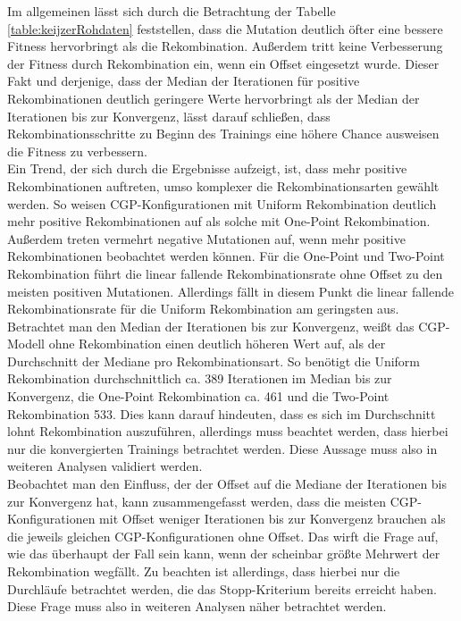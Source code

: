 Im allgemeinen lässt sich durch die Betrachtung der Tabelle \ref{table:keijzerRohdaten} feststellen, dass die Mutation deutlich öfter eine bessere Fitness hervorbringt als die Rekombination.
Außerdem tritt keine Verbesserung der Fitness durch Rekombination ein, wenn ein Offset eingesetzt wurde.
Dieser Fakt und derjenige, dass der Median der Iterationen für positive Rekombinationen deutlich geringere Werte hervorbringt als der Median der Iterationen bis zur Konvergenz, lässt darauf schließen, dass Rekombinationsschritte zu Beginn des Trainings eine höhere Chance ausweisen die Fitness zu verbessern.\\
Ein Trend, der sich durch die Ergebnisse aufzeigt, ist, dass mehr positive Rekombinationen auftreten, umso komplexer die Rekombinationsarten gewählt werden.
So weisen CGP-Konfigurationen mit Uniform Rekombination deutlich mehr positive Rekombinationen auf als solche mit One-Point Rekombination.
Außerdem treten vermehrt negative Mutationen auf, wenn mehr positive Rekombinationen beobachtet werden können.
Für die One-Point und Two-Point Rekombination führt die linear fallende Rekombinationsrate ohne Offset zu den meisten positiven Mutationen.
Allerdings fällt in diesem Punkt die linear fallende Rekombinationsrate für die Uniform Rekombination am geringsten aus.\\
Betrachtet man den Median der Iterationen bis zur Konvergenz, weißt das CGP-Modell ohne Rekombination einen deutlich höheren Wert auf, als der Durchschnitt der Mediane pro Rekombinationsart. 
So benötigt die Uniform Rekombination durchschnittlich ca. 389 Iterationen im Median bis zur Konvergenz, die One-Point Rekombination ca. 461 und die Two-Point Rekombination 533.
Dies kann darauf hindeuten, dass es sich im Durchschnitt lohnt Rekombination auszuführen, allerdings muss beachtet werden, dass hierbei nur die konvergierten Trainings betrachtet werden.
Diese Aussage muss also in weiteren Analysen validiert werden.\\
Beobachtet man den Einfluss, der der Offset auf die Mediane der Iterationen bis zur Konvergenz hat, kann zusammengefasst werden, dass die meisten CGP-Konfigurationen mit Offset weniger Iterationen bis zur Konvergenz brauchen als die jeweils gleichen CGP-Konfigurationen ohne Offset.
Das wirft die Frage auf, wie das überhaupt der Fall sein kann, wenn der scheinbar größte Mehrwert der Rekombination wegfällt.
Zu beachten ist allerdings, dass hierbei nur die Durchläufe betrachtet werden, die das Stopp-Kriterium bereits erreicht haben. 
Diese Frage muss also in weiteren Analysen näher betrachtet werden.


